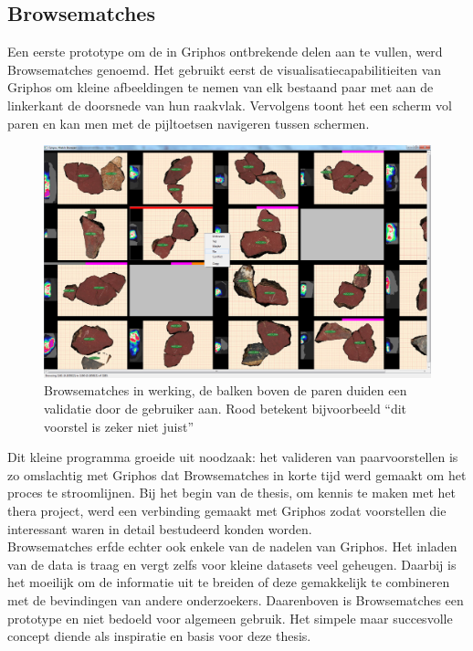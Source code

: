 \subsection{Browsematches}

Een eerste prototype om de in Griphos ontbrekende delen aan te vullen, werd Browsematches genoemd. Het gebruikt eerst de visualisatiecapabilitieiten van Griphos om kleine afbeeldingen te nemen van elk bestaand paar met aan de linkerkant de doorsnede van hun raakvlak. Vervolgens toont het een scherm vol paren en kan men met de pijltoetsen navigeren tussen schermen. \\

\begin{figure}[ht]
	\begin{center}
		\includegraphics[width=.8\columnwidth]{images/browsematches-01-cut.png}
		\caption{Browsematches in werking, de balken boven de paren duiden een validatie door de gebruiker aan. Rood betekent bijvoorbeeld ``dit voorstel is zeker niet juist''}
	\end{center}
\end{figure}

Dit kleine programma groeide uit noodzaak: het valideren van paarvoorstellen is zo omslachtig met Griphos dat Browsematches in korte tijd werd gemaakt om het proces te stroomlijnen. Bij het begin van de thesis, om kennis te maken met het thera project, werd een verbinding gemaakt met Griphos zodat voorstellen die interessant waren in detail bestudeerd konden worden.\\

Browsematches erfde echter ook enkele van de nadelen van Griphos. Het inladen van de data is traag en vergt zelfs voor kleine datasets veel geheugen. Daarbij is het moeilijk om de informatie uit te breiden of deze gemakkelijk te combineren met de bevindingen van andere onderzoekers. Daarenboven is Browsematches een prototype en niet bedoeld voor algemeen gebruik. Het simpele maar succesvolle concept diende als inspiratie en basis voor deze thesis. 

